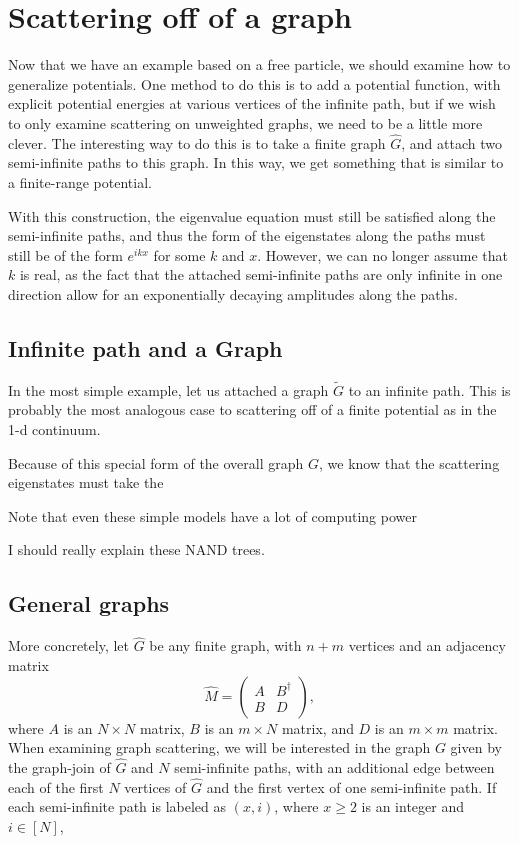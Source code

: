 \documentclass[../thesis-main/thesis-main]{subfiles}
\begin{document}
\section{Scattering off of a graph}

Now that we have an example based on a free particle, we should examine how to generalize potentials.  One method to do this is to add a potential function, with explicit potential energies at various vertices of the infinite path, but if we wish to only examine scattering on unweighted graphs, we need to be a little more clever.  The interesting way to do this is to take a finite graph $\hat{G}$, and attach two semi-infinite paths to this graph.  In this way, we get something that is similar to a finite-range potential.

With this construction, the eigenvalue equation must still be satisfied along the semi-infinite paths, and thus the form of the eigenstates along the paths must still be of the form $e^{i k x}$ for some $k$ and $x$.  However, we can no longer assume that $k$ is real, as the fact that the attached semi-infinite paths are only infinite in one direction allow for an exponentially decaying amplitudes along the paths.


\subsection{Infinite path and a Graph}

In the most simple example, let us attached a graph $\widetilde{G}$ to an infinite path.  This is probably the most analogous case to scattering off of a finite potential as in the 1-d continuum.  

Because of this special form of the overall graph $G$, we know that the scattering eigenstates must take the 

Note that even these simple models have a lot of computing power

I should really explain these NAND trees.


\subsection{General graphs}


More concretely, let $\widehat{G}$ be any finite graph, with $n+m$ vertices and an adjacency matrix
\begin{equation}
  \widehat{M} = \begin{pmatrix}A & B^\dag\\ B & D\end{pmatrix},
\end{equation}
where $A$ is an $N\times N$ matrix, $B$ is an $m\times N$ matrix, and $D$ is an $m\times m$ matrix.  When examining graph scattering, we will be interested in the graph $G$ given by the graph-join of $\widehat{G}$ and $N$ semi-infinite paths, with an additional edge between each of the first $N$ vertices of $\widehat{G}$ and the first vertex of one semi-infinite path.  If each semi-infinite path is labeled as $(x,i)$, where $x\geq 2$ is an integer and $i\in[N]$, 
\end{document}
